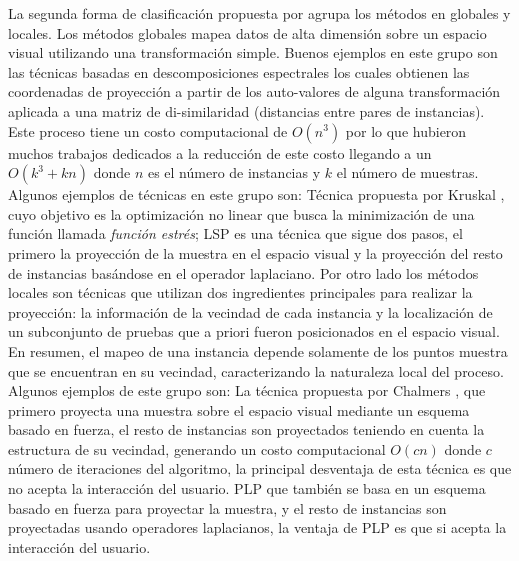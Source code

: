 La segunda forma de clasificación propuesta por \cite{ joia2011local} agrupa los métodos en globales y locales. Los métodos globales mapea  datos de alta dimensión sobre un espacio visual utilizando una transformación simple. Buenos ejemplos en este grupo son las técnicas basadas en descomposiciones espectrales los cuales obtienen las coordenadas de proyección a partir de los auto-valores de alguna transformación aplicada a una matriz de di-similaridad (distancias entre pares de instancias). Este proceso tiene un costo computacional de $O(n^3)$ por lo que hubieron muchos trabajos dedicados a la reducción de este costo llegando a un $O(k^3+kn)$  \cite{Tenenbaum2004sparse} donde $n$ es el número de instancias y $k$ el número de muestras.  Algunos ejemplos de técnicas en este grupo son: Técnica propuesta por Kruskal \cite{joseph1978multidimensional}, cuyo objetivo  es la optimización no linear que busca la minimización de una función llamada \textit{función estrés};  \ac{LSP}  \cite{Paulovich2008LSP} es una técnica que sigue dos pasos, el primero la proyección de la muestra en el espacio visual y la proyección del resto de instancias basándose en el operador laplaciano. Por otro lado los métodos locales son técnicas que utilizan dos ingredientes principales para realizar la proyección: la información de la vecindad de cada instancia y la localización de un subconjunto de pruebas que a priori fueron posicionados en el espacio visual. En resumen, el mapeo de una instancia depende solamente de los puntos muestra que se encuentran en su vecindad, caracterizando la naturaleza local del proceso. Algunos ejemplos de este grupo son: La técnica propuesta por Chalmers , que primero proyecta una muestra sobre el espacio visual mediante un esquema basado en fuerza,  el resto de instancias son proyectados teniendo en cuenta la estructura de su vecindad, generando un costo computacional $O(cn)$ donde $c$ número de iteraciones  del algoritmo, la principal desventaja de esta técnica es que no acepta la interacción del usuario.  \ac{PLP} \cite{paulovich2011piece} que también se basa en un  esquema basado en fuerza para proyectar la muestra, y el resto de instancias son proyectadas usando operadores laplacianos, la ventaja de PLP es que si acepta la interacción del usuario.

